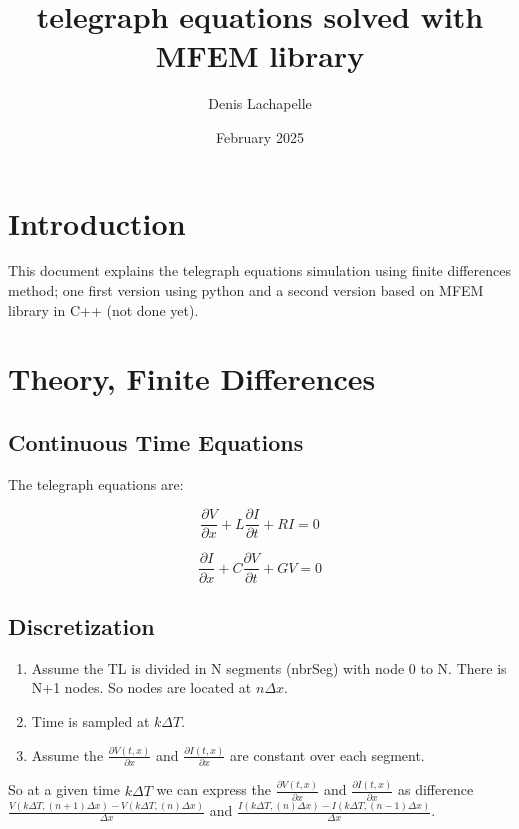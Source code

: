 \documentclass[12pt, letterpaper]{article}
\title{telegraph equations solved with MFEM library}
\author{Denis Lachapelle}
\date{February 2025}
\begin{document}
\maketitle

\section{Introduction}
This document explains the telegraph equations simulation using finite differences method; one first version using python and a second version based on MFEM library in C++ (not done yet).


\section{Theory, Finite Differences}
\subsection{Continuous Time Equations}

The telegraph equations are:

\begin{equation}\frac{\partial{V}}{\partial{x}} + L \frac{\partial{I}}{\partial{t}} + R I = 0\end{equation}


\begin{equation}\frac{\partial{I}}{\partial{x}} + C \frac{\partial{V}}{\partial{t}} + G V = 0\end{equation}

\subsection{Discretization}

\begin{enumerate}
\item Assume the TL is divided in N segments (nbrSeg) with node 0 to N. There is N+1 nodes. So nodes are located at $n \Delta x$.
\item Time is sampled at $k \Delta T$.
\item Assume the $\frac{\partial V(t, x)}{\partial x}$ and $\frac{\partial I(t, x)}{\partial x}$ are constant over each segment.
\end{enumerate}

So at a given time $k \Delta T$ we can express the $\frac{\partial V(t, x)}{\partial x}$ and $\frac{\partial I(t, x)}{\partial x}$ as difference  $\frac{V(k \Delta T, (n+1) \Delta x) - V(k \Delta T, (n) \Delta x)}{\Delta x}$ and  $\frac{I(k \Delta T, (n) \Delta x) - I(k \Delta T, (n-1) \Delta x)}{\Delta x}$.\\
\end{document}
